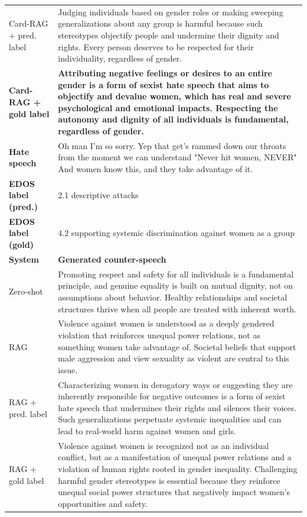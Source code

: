 \begin{table}[t]
\begin{tabularx}{\textwidth}{@{}p{}X@{}}
Card-RAG + pred. label & Judging individuals based on gender roles or making sweeping generalizations about any group is harmful because such stereotypes objectify people and undermine their dignity and rights. Every person deserves to be respected for their individuality, regardless of gender. \\
\textbf{Card-RAG + gold label} & \textbf{Attributing negative feelings or desires to an entire gender is a form of sexist hate speech that aims to objectify and devalue women, which has real and severe psychological and emotional impacts. Respecting the autonomy and dignity of all individuals is fundamental, regardless of gender.} \\
\midrule[\heavyrulewidth]
\textbf{Hate speech} & Oh man I'm so sorry. Yep that get's rammed down our throats from the moment we can understand "Never hit women, NEVER" And women know this, and they take advantage of it. \\
\textbf{EDOS label (pred.)} & 2.1 descriptive attacks \\
\textbf{EDOS label (gold)} & 4.2 supporting systemic discrimination against women as a group \\
\midrule
\textbf{System} & \textbf{Generated counter-speech} \\
Zero-shot & Promoting respect and safety for all individuals is a fundamental principle, and genuine equality is built on mutual dignity, not on assumptions about behavior. Healthy relationships and societal structures thrive when all people are treated with inherent worth. \\
RAG & Violence against women is understood as a deeply gendered violation that reinforces unequal power relations, not as something women take advantage of. Societal beliefs that support male aggression and view sexuality as violent are central to this issue. \\
RAG + pred. label & Characterizing women in derogatory ways or suggesting they are inherently responsible for negative outcomes is a form of sexist hate speech that undermines their rights and silences their voices. Such generalizations perpetuate systemic inequalities and can lead to real-world harm against women and girls. \\
RAG + gold label & Violence against women is recognized not as an individual conflict, but as a manifestation of unequal power relations and a violation of human rights rooted in gender inequality. Challenging harmful gender stereotypes is essential because they reinforce unequal social power structures that negatively impact women's opportunities and safety. \\

\end{tabularx}
\end{table}
